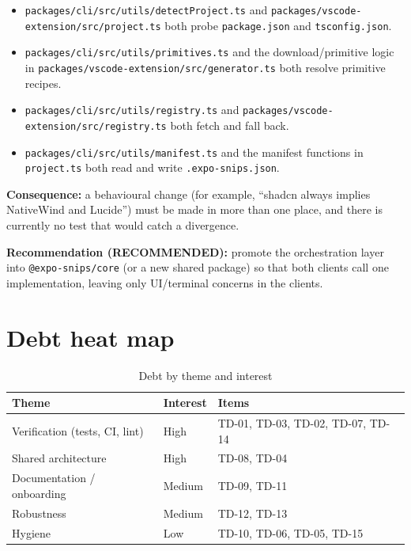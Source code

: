 \begin{itemize}
  \item \texttt{packages/cli/src/utils/detectProject.ts} and
        \texttt{packages/vscode-extension/src/project.ts} both probe
        \texttt{package.json} and \texttt{tsconfig.json}.
  \item \texttt{packages/cli/src/utils/primitives.ts} and the download/primitive
        logic in \texttt{packages/vscode-extension/src/generator.ts} both resolve
        primitive recipes.
  \item \texttt{packages/cli/src/utils/registry.ts} and
        \texttt{packages/vscode-extension/src/registry.ts} both fetch and fall
        back.
  \item \texttt{packages/cli/src/utils/manifest.ts} and the manifest functions in
        \texttt{project.ts} both read and write \texttt{.expo-snips.json}.
\end{itemize}

\textbf{Consequence:} a behavioural change (for example, ``shadcn always implies
NativeWind and Lucide'') must be made in more than one place, and there is
currently no test that would catch a divergence.

\textbf{Recommendation (RECOMMENDED):} promote the orchestration layer into
\texttt{@expo-snips/core} (or a new shared package) so that both clients call one
implementation, leaving only UI/terminal concerns in the clients.

\section{Debt heat map}

\begin{table}[H]
\centering
\caption{Debt by theme and interest}
\begin{tabular}{p{5cm}p{1.7cm}p{7.5cm}}
\toprule
\textbf{Theme} & \textbf{Interest} & \textbf{Items} \\
\midrule
Verification (tests, CI, lint) & High & TD-01, TD-03, TD-02, TD-07, TD-14 \\
Shared architecture & High & TD-08, TD-04 \\
Documentation / onboarding & Medium & TD-09, TD-11 \\
Robustness & Medium & TD-12, TD-13 \\
Hygiene & Low & TD-10, TD-06, TD-05, TD-15 \\
\bottomrule
\end{tabular}
\end{table}

